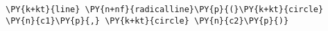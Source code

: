 \begin{Verbatim}[commandchars=\\\{\}]
    \PY{k+kt}{line} \PY{n+nf}{radicalline}\PY{p}{(}\PY{k+kt}{circle} \PY{n}{c1}\PY{p}{,} \PY{k+kt}{circle} \PY{n}{c2}\PY{p}{)}
\end{Verbatim}
